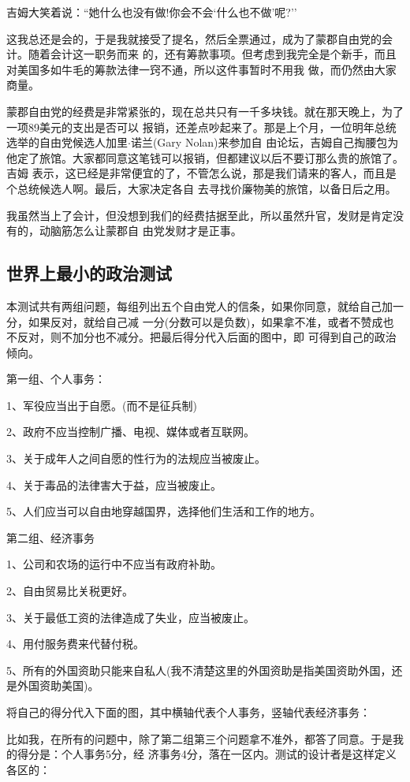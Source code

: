 ﻿\documentclass[11pt]{article}
\begin{document}
吉姆大笑着说：``她什么也没有做!你会不会`什么也不做'呢?''

这我总还是会的，于是我就接受了提名，然后全票通过，成为了蒙郡自由党的会计。随着会计这一职务而来
的，还有筹款事项。但考虑到我完全是个新手，而且对美国多如牛毛的筹款法律一窍不通，所以这件事暂时不用我
做，而仍然由大家商量。

蒙郡自由党的经费是非常紧张的，现在总共只有一千多块钱。就在那天晚上，为了一项89美元的支出是否可以
报销，还差点吵起来了。那是上个月，一位明年总统选举的自由党候选人加里$\cdot$诺兰(Gary Nolan)来参加自
由论坛，吉姆自己掏腰包为他定了旅馆。大家都同意这笔钱可以报销，但都建议以后不要订那么贵的旅馆了。吉姆
表示，这已经是非常便宜的了，不管怎么说，那是我们请来的客人，而且是个总统候选人啊。最后，大家决定各自
去寻找价廉物美的旅馆，以备日后之用。

我虽然当上了会计，但没想到我们的经费拮据至此，所以虽然升官，发财是肯定没有的，动脑筋怎么让蒙郡自
由党发财才是正事。

\subsection{世界上最小的政治测试}

本测试共有两组问题，每组列出五个自由党人的信条，如果你同意，就给自己加一分，如果反对，就给自己减
一分(分数可以是负数)，如果拿不准，或者不赞成也不反对，则不加分也不减分。把最后得分代入后面的图中，即
可得到自己的政治倾向。

第一组、个人事务：

1、军役应当出于自愿。(而不是征兵制)

2、政府不应当控制广播、电视、媒体或者互联网。

3、关于成年人之间自愿的性行为的法规应当被废止。

4、关于毒品的法律害大于益，应当被废止。

5、人们应当可以自由地穿越国界，选择他们生活和工作的地方。

第二组、经济事务

1、公司和农场的运行中不应当有政府补助。

2、自由贸易比关税更好。

3、关于最低工资的法律造成了失业，应当被废止。

4、用付服务费来代替付税。

5、所有的外国资助只能来自私人(我不清楚这里的外国资助是指美国资助外国，还是外国资助美国)。

将自己的得分代入下面的图，其中横轴代表个人事务，竖轴代表经济事务：

比如我，在所有的问题中，除了第二组第三个问题拿不准外，都答了同意。于是我的得分是：个人事务5分，经
济事务4分，落在一区内。测试的设计者是这样定义各区的：
\end{document}
